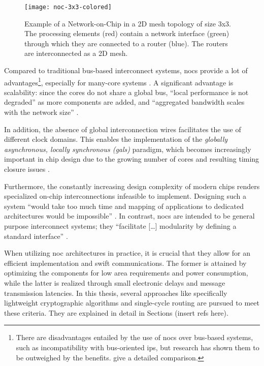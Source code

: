 \begin{figure}
    \centering
    \texttt{[image: noc-3x3-colored]}
    \caption[Example of a 3x3 mesh NoC]{Example of a Network-on-Chip in a 2D mesh topology of size 3x3. The processing elements (red) contain a network interface
    (green) through which they are connected to a router (blue). The routers are interconnected as a 2D mesh.}
    \label{fig:nocexample}
\end{figure}

Compared to traditional bus-based interconnect systems, \glspl{noc} provide a lot of advantages\footnote{There are disadvantages entailed by
the use of \glspl{noc} over bus-based systems, such as incompatibility with bus-oriented \glspl{ip}, but research has shown them to be outweighed
by the benefits. \citeauthor{tatas16designingnocs} \cite[6]{tatas16designingnocs} give a detailed comparison.}, especially for many-core systems
\cite[5\psqq]{tatas16designingnocs}. A significant advantage is scalability: since the cores do not share a global bus, \enquote{local performance is not
degraded} \cite[6]{tatas16designingnocs} as more components are added, and \enquote{aggregated bandwidth scales with the network size}
\cite[6]{tatas16designingnocs}.

In addition, the absence of global interconnection wires facilitates the use of different clock domains. This enables the implementation of the
\textit{globally asynchronous, locally synchronous (\gls{gals})} paradigm, which becomes increasingly important in chip design due to the growing
number of cores and resulting timing closure issues \cites[3]{kumar02networkonchip}[2]{ivanov05nocintroduction}.

Furthermore, the constantly increasing design complexity of modern chips \cite{mack11mooreslaw} renders specialized on-chip
interconnections infeasible to implement. Designing such a system \enquote{would take too much time and mapping of applications to dedicated
architectures would be impossible} \cite[1]{kumar02networkonchip}. In contrast, \glspl{noc} are intended to be general purpose interconnect systems; they
\enquote{facilitate […] modularity by defining a standard interface} \cite[1]{dally01routepacketsnotwires}.

When utilizing \gls{noc} architectures in practice, it is crucial that they allow for an efficient implementation and swift communications. The
former is attained by optimizing the components for low area requirements and power consumption, while the latter is realized %
through small electronic delays and message transmission latencies. In this thesis, several approaches like specifically lightweight cryptographic
algorithms and single-cycle routing are pursued to meet these criteria. They are explained in detail in Sections (insert refs here).%

